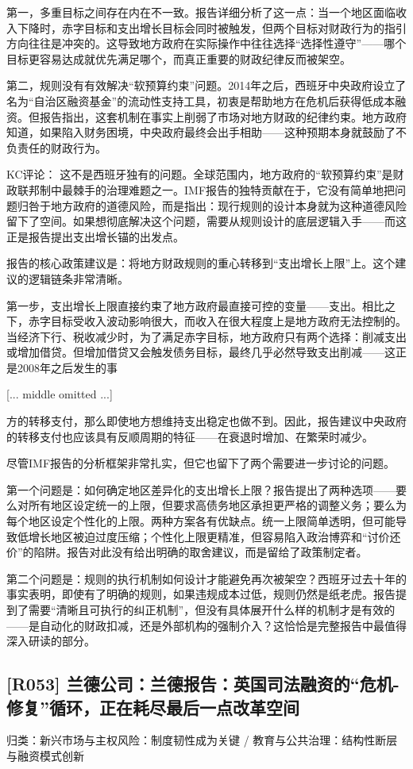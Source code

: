 \documentclass[11pt]{ctexart}
\begin{document}
第一，多重目标之间存在内在不一致。报告详细分析了这一点：当一个地区面临收入下降时，赤字目标和支出增长目标会同时被触发，但两个目标对财政行为的指引方向往往是冲突的。这导致地方政府在实际操作中往往选择“选择性遵守”——哪个目标更容易达成就优先满足哪个，而真正重要的财政纪律反而被架空。

第二，规则没有有效解决“软预算约束”问题。2014年之后，西班牙中央政府设立了名为“自治区融资基金”的流动性支持工具，初衷是帮助地方在危机后获得低成本融资。但报告指出，这套机制在事实上削弱了市场对地方财政的纪律约束。地方政府知道，如果陷入财务困境，中央政府最终会出手相助——这种预期本身就鼓励了不负责任的财政行为。

KC评论： 这不是西班牙独有的问题。全球范围内，地方政府的“软预算约束”是财政联邦制中最棘手的治理难题之一。IMF报告的独特贡献在于，它没有简单地把问题归咎于地方政府的道德风险，而是指出：现行规则的设计本身就为这种道德风险留下了空间。如果想彻底解决这个问题，需要从规则设计的底层逻辑入手——而这正是报告提出支出增长锚的出发点。

报告的核心政策建议是：将地方财政规则的重心转移到“支出增长上限”上。这个建议的逻辑链条非常清晰。

第一步，支出增长上限直接约束了地方政府最直接可控的变量——支出。相比之下，赤字目标受收入波动影响很大，而收入在很大程度上是地方政府无法控制的。当经济下行、税收减少时，为了满足赤字目标，地方政府只有两个选择：削减支出或增加借贷。但增加借贷又会触发债务目标，最终几乎必然导致支出削减——这正是2008年之后发生的事

[... middle omitted ...]

方的转移支付，那么即使地方想维持支出稳定也做不到。因此，报告建议中央政府的转移支付也应该具有反顺周期的特征——在衰退时增加、在繁荣时减少。

尽管IMF报告的分析框架非常扎实，但它也留下了两个需要进一步讨论的问题。

第一个问题是：如何确定地区差异化的支出增长上限？报告提出了两种选项——要么对所有地区设定统一的上限，但要求高债务地区承担更严格的调整义务；要么为每个地区设定个性化的上限。两种方案各有优缺点。统一上限简单透明，但可能导致低增长地区被迫过度压缩；个性化上限更精准，但容易陷入政治博弈和“讨价还价”的陷阱。报告对此没有给出明确的取舍建议，而是留给了政策制定者。

第二个问题是：规则的执行机制如何设计才能避免再次被架空？西班牙过去十年的事实表明，即使有了明确的规则，如果违规成本过低，规则仍然是纸老虎。报告提到了需要“清晰且可执行的纠正机制”，但没有具体展开什么样的机制才是有效的——是自动化的财政扣减，还是外部机构的强制介入？这恰恰是完整报告中最值得深入研读的部分。

\subsection{[R053] 兰德公司：兰德报告：英国司法融资的“危机-修复”循环，正在耗尽最后一点改革空间}
{\small\color{refgray}归类：新兴市场与主权风险：制度韧性成为关键 / 教育与公共治理：结构性断层与融资模式创新}
\end{document}
